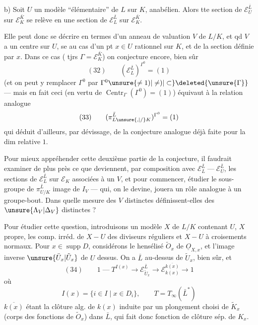 \noindent b) Soit $U$ un modèle ``élémentaire'' de $L$ sur $K$, anabélien. Alors tte section de $\mathcal E_U^{\bar L}$ sur $\mathcal E_K^{\bar K}$ se relève en une section de $\mathcal E_L^{\bar L}$ sur $\mathcal E_K^{\bar K}$.

Elle peut donc se décrire en termes d'un anneau de valuation $V$ de $L/K$, et qd $V$ a un centre sur $U$,  se  au cas d'un pt $x\in U$ rationnel sur $K$, et de la section définie par $x$. Dans ce cas ( tjrs $\Gamma=\mathcal E_K^{\bar K}$) on conjecture encore, bien sûr
\[
(32)\qquad (\mathcal E_L^{\bar L})^{\Gamma^0}=(1)
\]
(et on peut y remplacer $\Gamma^0$ par $\Gamma^0\unsure{\ne1)|\ne)|\subset}\deleted{\unsure{\Gamma}}$
--- mais en fait ceci (en vertu de $\operatorname{Centr}_\Gamma(\Gamma^0)=(1)$) équivaut à la relation analogue 
\[
(33)\qquad (\pi_{L\unsure{,|/}K}^{\bar L})^{\Gamma^0}=(1)
\]
qui  déduit d'ailleurs, par dévissage,
de la conjecture analogue déjà faite pour la dim relative $1$.

Pour mieux appréhender cette deuxième partie  de la conjecture, il faudrait examiner de plus près ce que deviennent, par composition avec $\mathcal E_L^{\bar L}\mathrel{\text{---}}\mathcal E_U^{\bar L}$, les sections de $\mathcal E_L^{\bar L}$ sur $\mathcal E_K$ associées à un $V$, et pour commencer, étudier le sous-groupe  de $\pi_{U/K}^{\bar L}$ image de $I_V$ --- qui, on le devine, jouera un rôle analogue à un groupe-bout. Dans quelle mesure des $V$ distinctes définissent-elles des $\unsure{\Lambda_V|\Delta_V}$ distinctes ?

Pour étudier cette question, introduisons un modèle $X$ de $L/K$ contenant $U$, $X$ propre, les comp. irréd. de  $X-U$ des diviseurs réguliers  et $X-U$ à croisements normaux. Pour $x\in\operatorname{supp}D$, considérons le hensélisé  $\tilde O_x$ de $\underline{O}_{X,x}$, et l'image inverse $\unsure{\bar U_x|\tilde U_x}$ de $U$ dessus. On a
$\bar L$ au-dessus de $\tilde U_x$, bien sûr, et
\[
 (34)\qquad
 1\mathrel{\text{---}}T^{I(x)}\longrightarrow
 \mathcal E_{\tilde U_x}^{\bar L}\longrightarrow
 \mathcal E_{k(x)}^{\overline{k(x)}}\longrightarrow 1
\]
où 
\[
 I(x)=\{i\in I\mid x\in D_i\},\qquad T=T_\infty(\bar L^*)
\]
$\overline{k(x)}$ étant la clôture alg. de $k(x)$ induite par un plongement choisi de $\tilde K_x$ (corps des fonctions de $\tilde O_x$) dans $\bar L$, qui fait donc fonction de clôture sép. de $K_x$.

